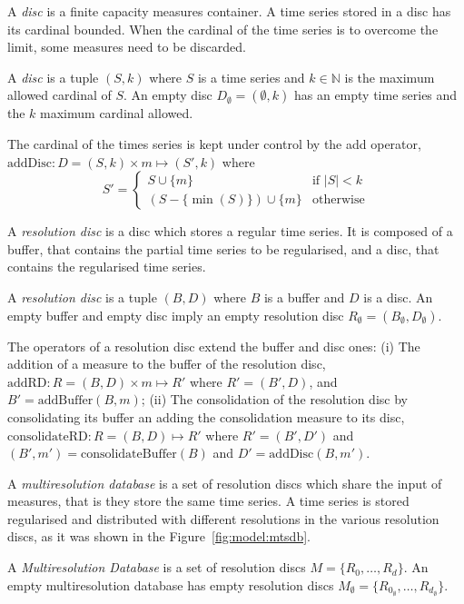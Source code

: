 A \emph{disc} is a finite capacity measures container. A time series
stored in a disc has its cardinal bounded. When the cardinal of the
time series is to overcome the limit, some measures need to be
discarded.
\begin{definition}[Disc]
  A \emph{disc} is a tuple $(S,k)$ where $S$ is a time series and
  $k\in\mathbb{N}$ is the maximum allowed cardinal of $S$.  An empty
  disc $D_{\emptyset} = (\emptyset,k)$ has an empty time series and
  the $k$ maximum cardinal allowed.
\end{definition}

The cardinal of the times series is kept under control by the add
operator, $\text{addDisc}:D=(S,k)\times m\mapsto (S',k)$ where 
$$
S' = \begin{cases}
  S\cup\{m\}                 & \text{if } |S|<k  \\
  (S-\{\min(S)\}) \cup \{m\} & \text{otherwise}
\end{cases}  
$$

A \emph{resolution disc} is a disc which stores a regular time
series. It is composed of a buffer, that contains the partial time
series to be regularised, and a disc, that contains the regularised
time series.
\begin{definition}
  A \emph{resolution disc} is a tuple $(B,D)$ where $B$ is a buffer
  and $D$ is a disc.  An empty buffer and empty disc imply an empty
  resolution disc $R_{\emptyset} = (B_{\emptyset},D_{\emptyset})$.
\end{definition}
 
The operators of a resolution disc extend the buffer and disc ones:
(i) The addition of a measure to the buffer of the resolution disc,
$\text{addRD}:R=(B,D) \times m \mapsto R'$ where $R'= (B',D)$, and
$B'= \text{addBuffer}(B,m)$; (ii) The consolidation of the resolution
disc by consolidating its buffer an adding the consolidation measure
to its disc, $\text{consolidateRD}:R=(B,D) \mapsto R'$ where $R'=
(B',D')$ and $(B',m') = \text{consolidateBuffer}(B)$ and $D'=
\text{addDisc}(B,m')$.

A \emph{multiresolution database} is a set of resolution discs which
share the input of measures, that is they store the same time
series. A time series is stored regularised and distributed with
different resolutions in the various resolution discs, as it was shown
in the Figure~\ref{fig:model:mtsdb}.
\begin{definition}
  A \emph{Multi\-re\-solution Database} is a set of resolution discs
  $M=\{R_0, \dots, R_d\}$.  An empty multiresolution database has
  empty resolution discs $M_{\emptyset}=\{R_{0_\emptyset}, \dots,
  R_{d_\emptyset}\}$.
\end{definition}

